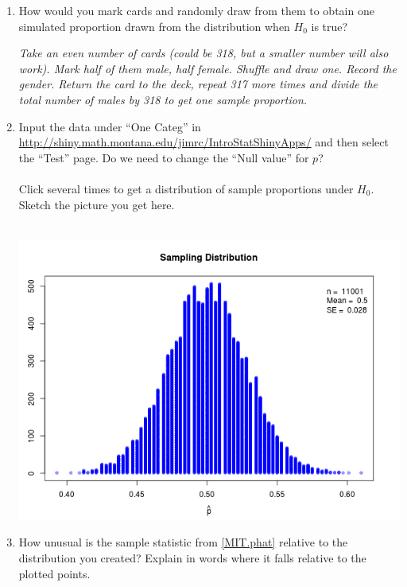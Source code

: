 \begin{enumerate}
\begin{enumerate}
\begin{key}
{\it $p = .5$.  Half of all idiots are male.}
\end{key}
$H_a:$
\begin{students}
    \vspace{1cm}    \\
\end{students}
\begin{key} 
{\it $p > .5$.  More than half of all idiots are male.}
\end{key}
    \item How would you mark cards and randomly draw from them to
      obtain one simulated proportion drawn from the distribution when
      $H_0$ is true?
\begin{students}
    \vspace{3cm}    
\end{students}
\begin{key} 
  {\it Take an even number of cards (could be 318, but a
    smaller number will also work). Mark half of them male, half
    female. Shuffle and draw one. Record the gender. Return the card
    to the deck, repeat 317 more times and divide the total number of
    males by 318 to get one sample proportion.}
\end{key}
    \item Input the data under ``One Categ'' in 
      \url{http://shiny.math.montana.edu/jimrc/IntroStatShinyApps/}
      and then select the  ``Test'' page.  Do we need to change the
      ``Null value'' for $p$?\\ \ \\
      Click  several times to get a distribution of sample
      proportions under $H_0$. 
      Sketch the picture you get here.
\begin{students}
    \vspace{5cm}    
\end{students}
\begin{key}
\ \  \\ \includegraphics[width=.3\linewidth]{plots/MIT-null.png}
\end{key}
  \item How unusual is the sample statistic from \ref{MIT.phat}
    relative to the distribution you created?  Explain in words where
    it falls relative to the plotted points.
\begin{students}
    \vspace{3cm}    
\end{students}


\end{enumerate}
\end{enumerate}
